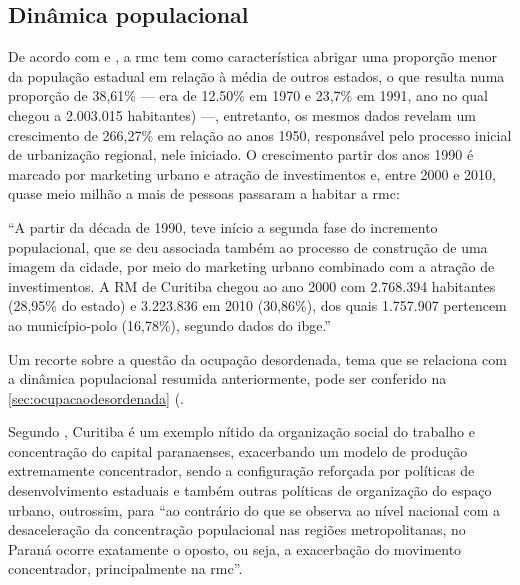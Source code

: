 	\subsection{Dinâmica populacional}
		
	De acordo com  e , a \gls{rmc} tem como característica abrigar uma proporção menor da população estadual em relação à média de outros estados, o que resulta numa proporção de 38,61\% --- era de 12.50\% em 1970 e 23,7\% em 1991, ano no qual chegou a 2.003.015 habitantes) ---, entretanto, os mesmos dados revelam um crescimento de 266,27\% em relação ao anos 1950, responsável pelo processo inicial de urbanização regional, nele iniciado. O crescimento partir dos anos 1990 é marcado por marketing urbano e atração de investimentos e, entre 2000 e 2010, quase meio milhão a mais de pessoas passaram a habitar a \gls{rmc}:
	
	\begin{citacao}
		``A partir da década de 1990, teve início a segunda fase do incremento populacional, que se deu associada também ao processo de construção de uma imagem da cidade, por meio do marketing urbano combinado com a atração de investimentos. A RM de Curitiba chegou ao ano 2000 com 2.768.394 habitantes (28,95\% do estado) e 3.223.836 em 2010 (30,86\%), dos quais 1.757.907 pertencem ao município-polo (16,78\%), segundo dados do \glsdesc{ibge}.'' 
	\end{citacao}

	Um recorte sobre a questão da ocupação desordenada, tema que se relaciona com a dinâmica populacional resumida anteriormente, pode ser conferido na \autoref{sec:ocupacaodesordenada} (.

	Segundo , Curitiba é um exemplo nítido da organização social do trabalho e concentração do capital paranaenses, exacerbando um modelo de produção extremamente concentrador, sendo a configuração reforçada por políticas de desenvolvimento estaduais e também outras políticas de organização do espaço urbano, outrossim, para  ``ao contrário do que se observa ao nível nacional com a desaceleração da concentração populacional nas regiões metropolitanas, no Paraná ocorre exatamente o oposto, ou seja, a exacerbação do movimento concentrador, principalmente na \glsdesc{rmc}''.
	
